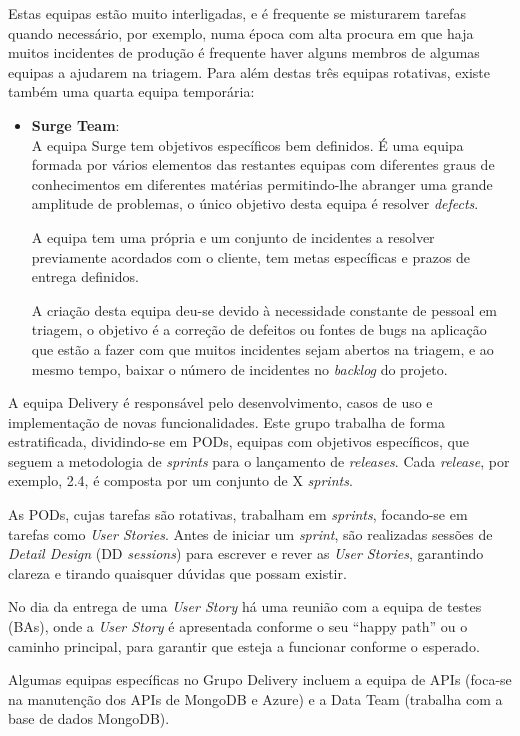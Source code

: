 \begin{itemize}
                    Estas equipas estão muito interligadas, e é frequente se misturarem tarefas quando necessário, por exemplo, numa época com alta procura em que haja muitos incidentes de produção é frequente haver alguns membros de algumas equipas a ajudarem na triagem.
                    Para além destas três equipas rotativas, existe também uma quarta equipa temporária:
                    \begin{itemize}
                        \item \textbf{Surge Team}: \\
                            A equipa Surge tem objetivos específicos bem definidos. É uma equipa formada por vários elementos das restantes equipas com diferentes graus de conhecimentos em diferentes matérias permitindo-lhe abranger uma grande amplitude de problemas, o único objetivo desta equipa é resolver \textit{defects}. 
                            
                            A equipa tem uma  própria e um conjunto de incidentes a resolver previamente acordados com o cliente, tem metas específicas e prazos de entrega definidos. 

                            A criação desta equipa deu-se devido à necessidade constante de pessoal em triagem, o objetivo é a correção de defeitos ou fontes de bugs na aplicação que estão a fazer com que muitos incidentes sejam abertos na triagem, e ao mesmo tempo, baixar o número de incidentes no \textit{backlog} do projeto.

                    \end{itemize}
                \end{itemize}

                
            
                A equipa Delivery é responsável pelo desenvolvimento, casos de uso e implementação de novas funcionalidades. Este grupo trabalha de forma estratificada, dividindo-se em PODs, equipas com objetivos específicos, que seguem a metodologia de \textit{sprints} para o lançamento de \textit{releases}. Cada \textit{release}, por exemplo, 2.4, é composta por um conjunto de X \textit{sprints}.
                
                As PODs, cujas tarefas são rotativas, trabalham em \textit{sprints}, focando-se em tarefas como \textit{User Stories}. Antes de iniciar um \textit{sprint}, são realizadas sessões de \textit{Detail Design} (DD \textit{sessions}) para escrever e rever as \textit{User Stories}, garantindo clareza e tirando quaisquer dúvidas que possam existir.
                
                No dia da entrega de uma \textit{User Story} há uma reunião com a equipa de testes (BAs), onde a \textit{User Story} é apresentada conforme o seu ``happy path'' ou o caminho principal, para garantir que esteja a funcionar conforme o esperado.
                
                Algumas equipas específicas no Grupo Delivery incluem a equipa de APIs (foca-se na manutenção dos APIs de MongoDB e Azure) e a Data Team (trabalha com a base de dados MongoDB).
